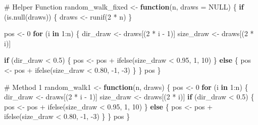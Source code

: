 \documentclass[
  letterpaper,
  DIV=11,
  numbers=noendperiod]{scrartcl}
\newenvironment{Shaded}{\begin{snugshade}}{\end{snugshade}}
\newcommand{\AttributeTok}[1]{\textcolor[rgb]{0.40,0.45,0.13}{#1}}
\newcommand{\CommentTok}[1]{\textcolor[rgb]{0.37,0.37,0.37}{#1}}
\newcommand{\ConstantTok}[1]{\textcolor[rgb]{0.56,0.35,0.01}{#1}}
\newcommand{\ControlFlowTok}[1]{\textcolor[rgb]{0.00,0.23,0.31}{\textbf{#1}}}
\newcommand{\DecValTok}[1]{\textcolor[rgb]{0.68,0.00,0.00}{#1}}
\newcommand{\FloatTok}[1]{\textcolor[rgb]{0.68,0.00,0.00}{#1}}
\newcommand{\FunctionTok}[1]{\textcolor[rgb]{0.28,0.35,0.67}{#1}}
\newcommand{\NormalTok}[1]{\textcolor[rgb]{0.00,0.23,0.31}{#1}}
\newcommand{\OtherTok}[1]{\textcolor[rgb]{0.00,0.23,0.31}{#1}}
\newcommand{\SpecialCharTok}[1]{\textcolor[rgb]{0.37,0.37,0.37}{#1}}
\begin{document}
\begin{Shaded}
\begin{Highlighting}[]
\CommentTok{\# Helper Function}
\NormalTok{random\_walk\_fixed }\OtherTok{\textless{}{-}} \ControlFlowTok{function}\NormalTok{(n, }\AttributeTok{draws =} \ConstantTok{NULL}\NormalTok{) \{}
  \ControlFlowTok{if}\NormalTok{ (}\FunctionTok{is.null}\NormalTok{(draws)) \{}
\NormalTok{    draws }\OtherTok{\textless{}{-}} \FunctionTok{runif}\NormalTok{(}\DecValTok{2} \SpecialCharTok{*}\NormalTok{ n)}
\NormalTok{  \}}
  
\NormalTok{  pos }\OtherTok{\textless{}{-}} \DecValTok{0}
  \ControlFlowTok{for}\NormalTok{ (i }\ControlFlowTok{in} \DecValTok{1}\SpecialCharTok{:}\NormalTok{n) \{}
\NormalTok{    dir\_draw }\OtherTok{\textless{}{-}}\NormalTok{ draws[(}\DecValTok{2} \SpecialCharTok{*}\NormalTok{ i }\SpecialCharTok{{-}} \DecValTok{1}\NormalTok{)]}
\NormalTok{    size\_draw }\OtherTok{\textless{}{-}}\NormalTok{ draws[(}\DecValTok{2} \SpecialCharTok{*}\NormalTok{ i)]}
    
    \ControlFlowTok{if}\NormalTok{ (dir\_draw }\SpecialCharTok{\textless{}} \FloatTok{0.5}\NormalTok{) \{}
\NormalTok{      pos }\OtherTok{\textless{}{-}}\NormalTok{ pos }\SpecialCharTok{+} \FunctionTok{ifelse}\NormalTok{(size\_draw }\SpecialCharTok{\textless{}} \FloatTok{0.95}\NormalTok{, }\DecValTok{1}\NormalTok{, }\DecValTok{10}\NormalTok{)}
\NormalTok{    \} }\ControlFlowTok{else}\NormalTok{ \{}
\NormalTok{      pos }\OtherTok{\textless{}{-}}\NormalTok{ pos }\SpecialCharTok{+} \FunctionTok{ifelse}\NormalTok{(size\_draw }\SpecialCharTok{\textless{}} \FloatTok{0.80}\NormalTok{, }\SpecialCharTok{{-}}\DecValTok{1}\NormalTok{, }\SpecialCharTok{{-}}\DecValTok{3}\NormalTok{)}
\NormalTok{    \}}
\NormalTok{  \}}
\NormalTok{  pos}
\NormalTok{\}}


\CommentTok{\# Method 1}
\NormalTok{random\_walk1 }\OtherTok{\textless{}{-}} \ControlFlowTok{function}\NormalTok{(n, draws) \{}
\NormalTok{  pos }\OtherTok{\textless{}{-}} \DecValTok{0}
  \ControlFlowTok{for}\NormalTok{ (i }\ControlFlowTok{in} \DecValTok{1}\SpecialCharTok{:}\NormalTok{n) \{}
\NormalTok{    dir\_draw }\OtherTok{\textless{}{-}}\NormalTok{ draws[(}\DecValTok{2} \SpecialCharTok{*}\NormalTok{ i }\SpecialCharTok{{-}} \DecValTok{1}\NormalTok{)]}
\NormalTok{    size\_draw }\OtherTok{\textless{}{-}}\NormalTok{ draws[(}\DecValTok{2} \SpecialCharTok{*}\NormalTok{ i)]}
    \ControlFlowTok{if}\NormalTok{ (dir\_draw }\SpecialCharTok{\textless{}} \FloatTok{0.5}\NormalTok{) \{}
\NormalTok{      pos }\OtherTok{\textless{}{-}}\NormalTok{ pos }\SpecialCharTok{+} \FunctionTok{ifelse}\NormalTok{(size\_draw }\SpecialCharTok{\textless{}} \FloatTok{0.95}\NormalTok{, }\DecValTok{1}\NormalTok{, }\DecValTok{10}\NormalTok{)}
\NormalTok{    \} }\ControlFlowTok{else}\NormalTok{ \{}
\NormalTok{      pos }\OtherTok{\textless{}{-}}\NormalTok{ pos }\SpecialCharTok{+} \FunctionTok{ifelse}\NormalTok{(size\_draw }\SpecialCharTok{\textless{}} \FloatTok{0.80}\NormalTok{, }\SpecialCharTok{{-}}\DecValTok{1}\NormalTok{, }\SpecialCharTok{{-}}\DecValTok{3}\NormalTok{)}
\NormalTok{    \}}
\NormalTok{  \}}
\NormalTok{  pos}
\NormalTok{\}}


\end{Highlighting}
\end{Shaded}
\end{document}

